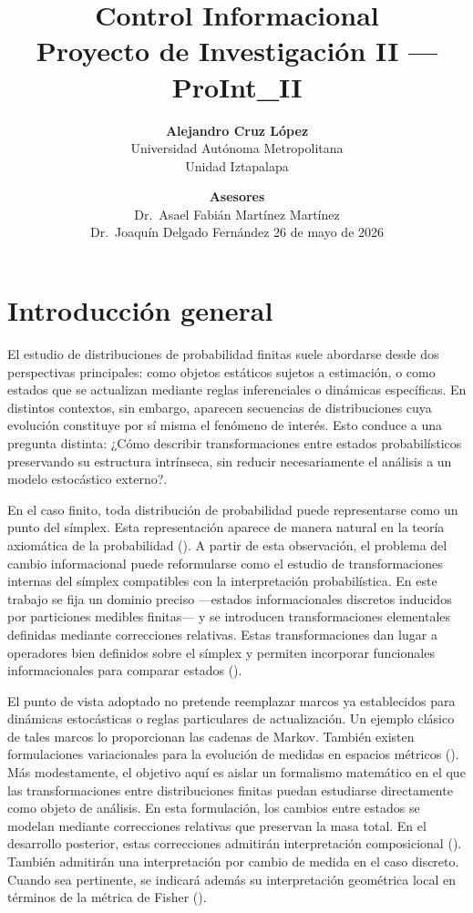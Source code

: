 ﻿\documentclass[12pt]{article}
\title{Control Informacional\\
\large Proyecto de Investigación II --- ProInt\_II}
\author{
\textbf{Alejandro Cruz López} \\
Universidad Autónoma Metropolitana \\
Unidad Iztapalapa
}
\date{
\vspace{1em}
\textbf{Asesores} \\[0.3em]
Dr.\ Asael Fabián Martínez Martínez \\
Dr.\ Joaquín Delgado Fernández
\vspace{1em}
26 de mayo de 2026
}
\begin{document}
\maketitle

\section*{Introducción general}

El estudio de distribuciones de probabilidad finitas suele abordarse desde dos perspectivas principales: como objetos estáticos sujetos a estimación, o como estados que se actualizan mediante reglas inferenciales o dinámicas específicas. En distintos contextos, sin embargo, aparecen secuencias de distribuciones cuya evolución constituye por sí misma el fenómeno de interés. Esto conduce a una pregunta distinta: ¿Cómo describir transformaciones entre estados probabilísticos preservando su estructura intrínseca, sin reducir necesariamente el análisis a un modelo estocástico externo?.

En el caso finito, toda distribución de probabilidad puede representarse como un punto del símplex. Esta representación aparece de manera natural en la teoría axiomática de la probabilidad (\cite{Kolmogorov1933}). A partir de esta observación, el problema del cambio informacional puede reformularse como el estudio de transformaciones internas del símplex compatibles con la interpretación probabilística. En este trabajo se fija un dominio preciso ---estados informacionales discretos inducidos por particiones medibles finitas--- y se introducen transformaciones elementales definidas mediante correcciones relativas. Estas transformaciones dan lugar a operadores bien definidos sobre el símplex y permiten incorporar funcionales informacionales para comparar estados (\cite{Csiszar1975}).

El punto de vista adoptado no pretende reemplazar marcos ya establecidos para dinámicas estocásticas o reglas particulares de actualización. Un ejemplo clásico de tales marcos lo proporcionan las cadenas de Markov. También existen formulaciones variacionales para la evolución de medidas en espacios métricos (\cite{JordanKinderlehrerOtto1998}). Más modestamente, el objetivo aquí es aislar un formalismo matemático en el que las transformaciones entre distribuciones finitas puedan estudiarse directamente como objeto de análisis. En esta formulación, los cambios entre estados se modelan mediante correcciones relativas que preservan la masa total. En el desarrollo posterior, estas correcciones admitirán interpretación composicional (\cite{Aitchison1986}). También admitirán una interpretación por cambio de medida en el caso discreto. Cuando sea pertinente, se indicará además su interpretación geométrica local en términos de la métrica de Fisher (\cite{Amari2016}).
\end{document}
